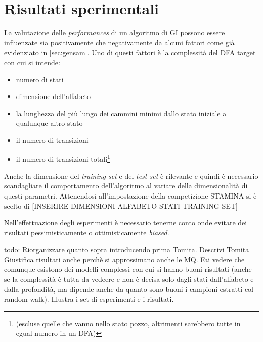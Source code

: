 
\chapter{Risultati sperimentali} %
\label{cap:sette}
La valutazione delle \textit{performances} di un algoritmo di \ac{GI} possono essere influenzate sia positivamente che negativamente da alcuni fattori come già evidenziato in \ref{sec:gensam}. Uno di questi fattori è la complessità del \ac{DFA} target con cui si intende\cite{Stamina10}:
\begin{itemize}
\item numero di stati
\item dimensione dell'alfabeto
\item la lunghezza del più lungo dei cammini minimi dallo stato iniziale a qualunque altro stato
\item il numero di transizioni
\item il numero di transizioni totali\footnote{ (escluse quelle che vanno nello stato pozzo, altrimenti sarebbero tutte in egual numero in un \ac{DFA})}
\end{itemize}
Anche la dimensione del \textit{training set} e del \textit{test set} è rilevante e quindi è necessario scandagliare il comportamento dell'algoritmo al variare della dimensionalità di questi parametri. Attenendosi all'impostazione della competizione STAMINA \cite{Stamina10} si è scelto di [INSERIRE DIMENSIONI ALFABETO STATI TRAINING SET]

Nell'effettuazione degli esperimenti è necessario tenerne conto onde evitare dei risultati pessimisticamente o ottimisticamente \textit{biased}. 

todo:
Riorganizzare quanto sopra introducendo prima Tomita.
Descrivi Tomita
Giustifica risultati anche perchè si approssimano anche le MQ.
Fai vedere che comunque esistono dei modelli complessi con cui si hanno buoni risultati (anche se la complessità è tutta da vedeere e non è decisa solo dagli stati dall'alfabeto e dalla profondità, ma dipende anche da quanto sono buoni i campioni estratti col random walk).
Illustra i set di esperimenti e i risultati.